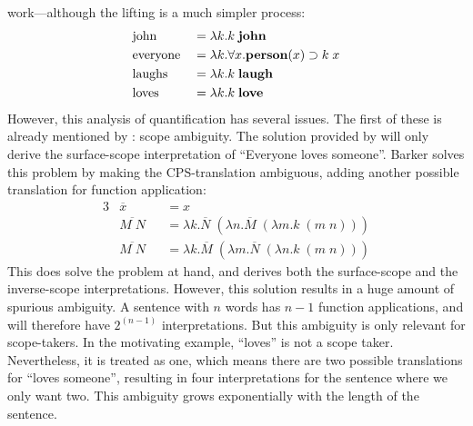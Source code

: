 work---although the lifting is a much simpler process:
\begin{alignat*}{3}
  &\text{john}     &&= \lambda k. k\;\mathbf{john}                          \\
  &\text{everyone} &&= \lambda k. \forall x. \mathbf{person}(x)\supset k\;x \\
  &\text{laughs}   &&= \lambda k. k\;\mathbf{laugh}                         \\
  &\text{loves}    &&= \lambda k. k\;\mathbf{love}
\end{alignat*}
However, this analysis of quantification has several issues. The first
of these is already mentioned by \citet{barker2004}: scope ambiguity.
The solution provided by \citet{barker2002,barker2004} will only
derive the surface-scope interpretation of ``Everyone loves
someone''. Barker solves this problem by making the CPS-translation
ambiguous, adding another possible translation for function
application:
\begin{alignat*}{3}
  &\overline{x}    &&= x\\
  &\overline{M\;N} &&= \lambda k. \overline{N}\;(\lambda n.\overline{M}\;(\lambda m.k\;(m\;n)))\\
  &\overline{M\;N} &&= \lambda k. \overline{M}\;(\lambda m.\overline{N}\;(\lambda n.k\;(m\;n)))
\end{alignat*}
This does solve the problem at hand, and derives both the
surface-scope and the inverse-scope interpretations. However, this
solution results in a huge amount of spurious ambiguity.
A sentence with $n$ words has $n-1$ function applications, and will
therefore have $2^{(n-1)}$ interpretations. But this ambiguity is only
relevant for scope-takers.
In the motivating example, ``loves'' is not a scope
taker. Nevertheless, it is treated as one, which means there are two
possible translations for ``loves someone'', resulting in four
interpretations for the sentence where we only want two. This
ambiguity grows exponentially with the length of the sentence.




